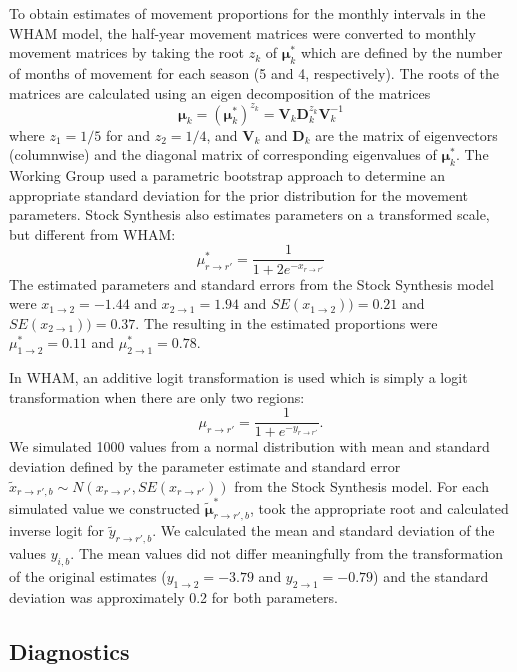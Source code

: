 \documentclass[
]{article}
\begin{document}
To obtain estimates of movement proportions for the monthly intervals in the WHAM model, the half-year movement matrices were converted to monthly movement matrices by taking the root \(z_k\) of \(\boldsymbol{\mu}^*_{k}\) which are defined by the number of months of movement for each season (5 and 4, respectively). The roots of the matrices are calculated using an eigen decomposition of the matrices
\[ \boldsymbol{\mu}_k =  \left(\boldsymbol{\mu}_k^*\right)^{z_k} = \mathbf{V}_k \mathbf{D}_k^{z_k} \mathbf{V}_k^{-1}\]
where \(z_1 = 1/5\) for and \(z_2 = 1/4\), and \(\mathbf{V}_{k}\) and \(\mathbf{D}_{k}\) are the matrix of eigenvectors (columnwise) and the diagonal matrix of corresponding eigenvalues of \(\boldsymbol{\mu}^*_k\). The Working Group used a parametric bootstrap approach to determine an appropriate standard deviation for the prior distribution for the movement parameters. Stock Synthesis also estimates parameters on a transformed scale, but different from WHAM:
\[\mu^*_{r\rightarrow r'} = \frac{1}{1 + 2e^{-x_{r\rightarrow r'}}}\]
The estimated parameters and standard errors from the Stock Synthesis model were \(x_{1\rightarrow 2}=-1.44\) and \(x_{2\rightarrow 1}=1.94\) and \(SE(x_{1\rightarrow 2})) = 0.21\) and \(SE(x_{2\rightarrow 1})) = 0.37\). The resulting in the estimated proportions were \(\mu^*_{1\rightarrow 2}=0.11\) and \(\mu^*_{2\rightarrow 1}=0.78\).

In WHAM, an additive logit transformation is used which is simply a logit transformation when there are only two regions:
\[
\mu_{r\rightarrow r'} = \frac{1}{1+e^{-y_{r\rightarrow r'}}}.
\]
We simulated 1000 values from a normal distribution with mean and standard deviation defined by the parameter estimate and standard error \(\tilde x_{{r\rightarrow r'},b} \sim N(x_{r\rightarrow r'}, SE(x_{r\rightarrow r'}))\) from the Stock Synthesis model. For each simulated value we constructed \(\tilde {\boldsymbol{\mu}}^*_{{r\rightarrow r'},b}\), took the appropriate root and calculated inverse logit for \(\tilde y_{{r\rightarrow r'},b}\). We calculated the mean and standard deviation of the values \(y_{i,b}\). The mean values did not differ meaningfully from the transformation of the original estimates (\(y_{1\rightarrow 2} = -3.79\) and \(y_{2\rightarrow 1} = -0.79\)) and the standard deviation was approximately 0.2 for both parameters.

\hypertarget{diagnostics}{%
\subsection*{Diagnostics}\label{diagnostics}}
\end{document}
